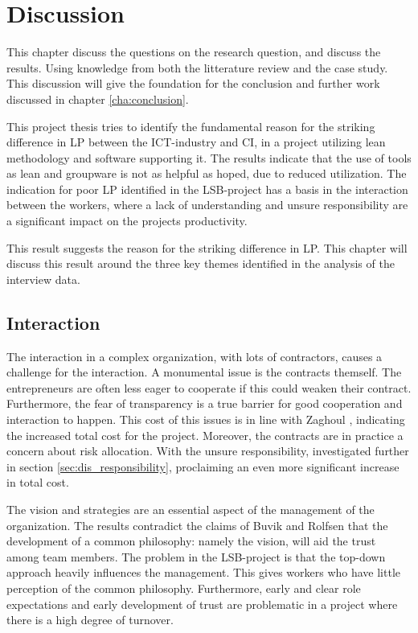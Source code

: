 
\chapter{Discussion} \label{cha:discussion}
This chapter discuss the questions on the research question, and discuss the results. Using knowledge from both the litterature review and the case study. This discussion will give the foundation for the conclusion and further work discussed in chapter \ref{cha:conclusion}. 

This project thesis tries to identify the fundamental reason for the striking difference in LP between the ICT-industry and CI, in a project utilizing lean methodology and software supporting it. The results indicate that the use of tools as lean and groupware is not as helpful as hoped, due to reduced utilization. The indication for poor LP identified in the LSB-project has a basis in the interaction between the workers, where a lack of understanding and unsure responsibility are a significant impact on the projects productivity. 

This result suggests the reason for the striking difference in LP. This chapter will discuss this result around the three key themes identified in the analysis of the interview data. 

\section{Interaction} \label{sec:dis_interaction}
The interaction in a complex organization, with lots of contractors, causes a challenge for the interaction. A monumental issue is the contracts themself. The entrepreneurs are often less eager to cooperate if this could weaken their contract. Furthermore, the fear of transparency is a true barrier for good cooperation and interaction to happen. This cost of this issues is in line with Zaghoul \cite{zaghloul2003construction}, indicating the increased total cost for the project. Moreover, the contracts are in practice a concern about risk allocation. With the unsure responsibility, investigated further in section \ref{sec:dis_responsibility}, proclaiming an even more significant increase in total cost. 

The vision and strategies are an essential aspect of the management of the organization. The results contradict the claims of Buvik and Rolfsen \cite{rolfsen} that the development of a common philosophy: namely the vision, will aid the trust among team members. The problem in the LSB-project is that the top-down approach heavily influences the management. This gives workers who have little perception of the common philosophy. Furthermore, early and clear role expectations and early development of trust are problematic in a project where there is a high degree of turnover. 

